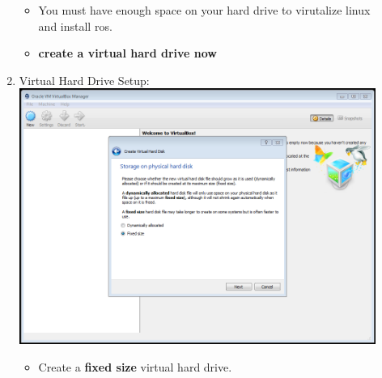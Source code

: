 \documentclass[12pt]{article}
\begin{document}
\begin{description}
\begin{enumerate}
\begin{itemize}
                \item You must have enough space on your hard drive to virutalize linux and install ros. 
                \item {\bf create a virtual hard drive now}
                
            \end{itemize}
	\newpage
\item Virtual Hard Drive Setup: \vspace{20mm} \\
      		\hspace*{-2.5cm}\includegraphics[scale=.6]{Capture5.png}\\
            \begin{itemize}
                
                \item Create a {\bf fixed size} virtual hard drive. 
                              

\end{itemize}
\end{enumerate}
\end{description}
\end{document}
